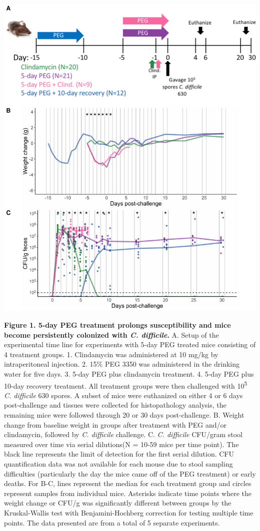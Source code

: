 \documentclass[
  11pt,
]{article}
\begin{document}
\newpage

\includegraphics{figure_1.pdf}

\textbf{Figure 1. 5-day PEG treatment prolongs susceptibility and mice
become persistently colonized with \emph{C. difficile}.} A. Setup of the
experimental time line for experiments with 5-day PEG treated mice
consisting of 4 treatment groups. 1. Clindamycin was administered at 10
mg/kg by intraperitoneal injection. 2. 15\% PEG 3350 was administered in
the drinking water for five days. 3. 5-day PEG plus clindamycin
treatment. 4. 5-day PEG plus 10-day recovery treatment. All treatment
groups were then challenged with 10\textsuperscript{5} \emph{C.
difficile} 630 spores. A subset of mice were euthanized on either 4 or 6
days post-challenge and tissues were collected for histopathology
analysis, the remaining mice were followed through 20 or 30 days
post-challenge. B. Weight change from baseline weight in groups after
treatment with PEG and/or clindamycin, followed by \emph{C. difficile}
challenge. C. \emph{C. difficile} CFU/gram stool measured over time via
serial dilutions(N = 10-59 mice per time point). The black line
represents the limit of detection for the first serial dilution. CFU
quantification data was not available for each mouse due to stool
sampling difficulties (particularly the day the mice came off of the PEG
treatment) or early deaths. For B-C, lines represent the median for each
treatment group and circles represent samples from individual mice.
Asterisks indicate time points where the weight change or CFU/g was
significantly different between groups by the Kruskal-Wallis test with
Benjamini-Hochberg correction for testing multiple time points. The data
presented are from a total of 5 separate experiments. \newpage
\end{document}
